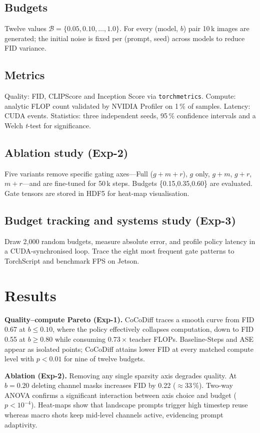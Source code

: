 \documentclass{article} %
\begin{document}
\subsection{Budgets}
Twelve values \(\mathcal{B}=\{0.05,0.10,\dots,1.0\}\). For every (model, \(b\)) pair 10\,k images are generated; the initial noise is fixed per (prompt, seed) across models to reduce FID variance.

\subsection{Metrics}
Quality: FID, CLIPScore and Inception Score via \texttt{torchmetrics}. Compute: analytic FLOP count validated by NVIDIA Profiler on 1\,\% of samples. Latency: CUDA events. Statistics: three independent seeds, 95\,\% confidence intervals and a Welch \emph{t}-test for significance.

\subsection{Ablation study (Exp-2)}
Five variants remove specific gating axes—Full (\(g+m+r\)), \(g\) only, \(g+m\), \(g+r\), \(m+r\)—and are fine-tuned for 50\,k steps. Budgets \{0.15,0.35,0.60\} are evaluated. Gate tensors are stored in HDF5 for heat-map visualisation.

\subsection{Budget tracking and systems study (Exp-3)}
Draw 2,000 random budgets, measure absolute error, and profile policy latency in a CUDA-synchronised loop. Trace the eight most frequent gate patterns to TorchScript and benchmark FPS on Jetson.

\section{Results}
\label{sec:results}
\textbf{Quality–compute Pareto (Exp-1).} CoCoDiff traces a smooth curve from FID 0.67 at \(b\le0.10\), where the policy effectively collapses computation, down to FID 0.55 at \(b\ge0.80\) while consuming 0.73\,\(\times\) teacher FLOPs. Baseline-Steps and ASE appear as isolated points; CoCoDiff attains lower FID at every matched compute level with \(p<0.01\) for nine of twelve budgets.

\textbf{Ablation (Exp-2).} Removing any single sparsity axis degrades quality. At \(b=0.20\) deleting channel masks increases FID by 0.22 (\(\approx33\,\%\)). Two-way ANOVA confirms a significant interaction between axis choice and budget (\(p<10^{-4}\)). Heat-maps show that landscape prompts trigger high timestep reuse whereas macro shots keep mid-level channels active, evidencing prompt adaptivity.
\end{document}
